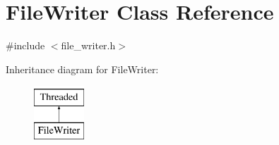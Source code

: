\hypertarget{class_file_writer}{
\section{FileWriter Class Reference}
\label{class_file_writer}
}


{\ttfamily \#include $<$file\_\-writer.h$>$}

Inheritance diagram for FileWriter:\begin{figure}[H]
\begin{center}
\leavevmode
\includegraphics[height=2.000000cm]{class_file_writer}
\end{center}
\end{figure}
